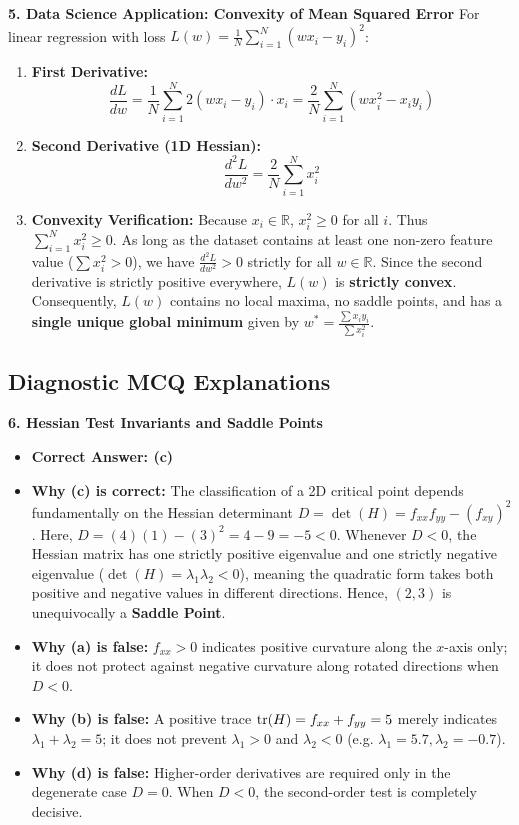 \textbf{5. Data Science Application: Convexity of Mean Squared Error}
For linear regression with loss $L(w) = \frac{1}{N} \sum_{i=1}^N (w x_i - y_i)^2$:
\begin{enumerate}
    \item \textbf{First Derivative:}
    \begin{equation*}
    \frac{dL}{dw} = \frac{1}{N} \sum_{i=1}^N 2(w x_i - y_i) \cdot x_i = \frac{2}{N} \sum_{i=1}^N (w x_i^2 - x_i y_i)
    \end{equation*}
    \item \textbf{Second Derivative (1D Hessian):}
    \begin{equation*}
    \frac{d^2 L}{dw^2} = \frac{2}{N} \sum_{i=1}^N x_i^2
    \end{equation*}
    \item \textbf{Convexity Verification:}
    Because $x_i \in \mathbb{R}$, $x_i^2 \ge 0$ for all $i$. Thus $\sum_{i=1}^N x_i^2 \ge 0$.
    As long as the dataset contains at least one non-zero feature value ($\sum x_i^2 > 0$), we have $\frac{d^2 L}{dw^2} > 0$ strictly for all $w \in \mathbb{R}$.
    Since the second derivative is strictly positive everywhere, $L(w)$ is \textbf{strictly convex}.
    Consequently, $L(w)$ contains no local maxima, no saddle points, and has a \textbf{single unique global minimum} given by $w^* = \frac{\sum x_i y_i}{\sum x_i^2}$.
\end{enumerate}

\subsection*{Diagnostic MCQ Explanations}

\textbf{6. Hessian Test Invariants and Saddle Points}
\begin{itemize}
    \item \textbf{Correct Answer: (c)}
    \item \textbf{Why (c) is correct:} The classification of a 2D critical point depends fundamentally on the Hessian determinant $D = \det(H) = f_{xx} f_{yy} - (f_{xy})^2$.
    Here, $D = (4)(1) - (3)^2 = 4 - 9 = -5 < 0$.
    Whenever $D < 0$, the Hessian matrix has one strictly positive eigenvalue and one strictly negative eigenvalue ($\det(H) = \lambda_1 \lambda_2 < 0$), meaning the quadratic form takes both positive and negative values in different directions. Hence, $(2, 3)$ is unequivocally a \textbf{Saddle Point}.
    \item \textbf{Why (a) is false:} $f_{xx} > 0$ indicates positive curvature along the $x$-axis only; it does not protect against negative curvature along rotated directions when $D < 0$.
    \item \textbf{Why (b) is false:} A positive trace $\operatorname{tr}(H) = f_{xx} + f_{yy} = 5$ merely indicates $\lambda_1 + \lambda_2 = 5$; it does not prevent $\lambda_1 > 0$ and $\lambda_2 < 0$ (e.g. $\lambda_1 = 5.7, \lambda_2 = -0.7$).
    \item \textbf{Why (d) is false:} Higher-order derivatives are required only in the degenerate case $D = 0$. When $D < 0$, the second-order test is completely decisive.
\end{itemize}

